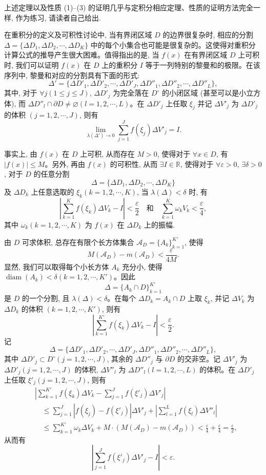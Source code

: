 上述定理以及性质 (1)--(3) 的证明几乎与定积分相应定理、性质的证明方法完全一样, 作为练习, 请读者自己给出.

在重积分的定义及可积性讨论中, 当有界闭区域 $D$ 的边界很复杂时, 相应的分割 $\Delta=\{\Delta D_1,\Delta D_2,\cdots,\Delta D_K\}$ 中的每个小集合也可能是很复杂的。这使得对重积分计算公式的推导产生很大困难。值得指出的是, 当 $f(x)$ 在有界闭区域 $D$ 上可积时, 我们可以证明 $f(x)$ 在 $D$ 上的重积分 $I$ 等于一列特别的黎曼和的极限。在该序列中, 黎曼和对应的分割具有下面的形式:
\[
  \Delta'=\{\Delta D'_1,\Delta D'_2,\cdots,\Delta D'_J,\Delta D''_1,\Delta D''_2,\cdots,\Delta D''_L\},
\]
其中, 对于 $\forall j(1\leqslant j\leqslant J)$, $\Delta D'_j$ 为完全落在 $D^\circ$ 的小闭区域 (甚至可以是小立方体), 而 $\Delta D''_l\cap\partial D\ne\varnothing(l=1,2,\cdots,L)$。在 $\Delta D'_j$ 上任取 $\xi_j$ 并记 $\Delta V'_j$ 为 $\Delta D'_j$ 的体积 $(j=1,2,\cdots,J)$, 则有
\[
  \lim_{\lambda(\Delta')\to0}\sum_{j=1}^J f(\xi_j)\Delta V'_j=I.
\]

事实上, 由 $f(x)$ 在 $D$ 上可积, 从而存在 $M>0$, 使得对于 $\forall x\in D$, 有 $|f(x)|\leqslant M$。另外, 再由 $f(x)$ 的可积性, 从而 $\exists I\in\mathbb R$, 使得对于 $\forall\varepsilon>0$, $\exists\delta>0$, 对于 $D$ 的任意分割
\[
  \Delta=\{\Delta D_1,\Delta D_2,\cdots,\Delta D_K\}
\]
及 $\Delta D_k$ 上任意选取的 $\xi_k(k=1,2,\cdots,K)$, 当 $\lambda(\Delta)<\delta$ 时, 有
\[
  \left|\sum_{k=1}^K f(\xi_k)\Delta V_k-I\right|<\frac{\varepsilon}{2}
  \quad\text{和}\quad
  \sum_{k=1}^K\omega_kV_k<\frac{\varepsilon}{4},
\]
其中 $\omega_k(k=1,2,\cdots,K)$ 为 $f(x)$ 在 $\Delta D_k$ 上的振幅.

由 $D$ 可求体积, 总存在有限个长方体集合 $\mathcal A_D=\{A_k\}_{k=1}^{K'}$, 使得
\[
  M(\mathcal A_D)-m(\mathcal A_D)<\frac{\varepsilon}{4M}.
\]
显然, 我们可以取得每个小长方体 $A_k$ 充分小, 使得 $\operatorname{diam}(A_k)<\delta(k=1,2,\cdots,K')$。因此
\[
  \Delta=\{A_k\cap D\}_{k=1}^{K'}
\]
是 $D$ 的一个分割, 且 $\lambda(\Delta)<\delta$。在每个 $\Delta D_k=A_k\cap D$ 上取 $\xi_k$, 并记 $\Delta V_k$ 为 $\Delta D_k$ 的体积 $(k=1,2,\cdots,K')$, 则有
\[
  \left|\sum_{k=1}^{K'} f(\xi_k)\Delta V_k-I\right|<\frac{\varepsilon}{2}.
\]
记
\[
  \Delta=\{\Delta D'_1,\Delta D'_2,\cdots,\Delta D'_J,\Delta D''_1,\Delta D''_2,\cdots,\Delta D''_L\},
\]
其中 $\Delta D'_j\subset D^\circ(j=1,2,\cdots,J)$, 其余的 $\Delta D''_j$ 与 $\partial D$ 的交非空。记 $\Delta V'_j$ 为 $\Delta D'_j(j=1,2,\cdots,J)$ 的体积, $\Delta V''_l$ 为 $\Delta D''_l(l=1,2,\cdots,L)$ 的体积。在 $\Delta D'_j$ 上任取 $\xi'_j(j=1,2,\cdots,J)$, 则有
\[
\begin{aligned}
  &\left|\sum_{k=1}^{K'}f(\xi_k)\Delta V_k-\sum_{j=1}^J f(\xi'_j)\Delta V'_j\right|\\
  &\quad\leqslant
  \sum_{j=1}^J|f(\xi_j)-f(\xi'_j)|\Delta V'_j+
  \left|\sum_{l=1}^L f(\xi_l)\Delta V''_l\right|\\
  &\quad\leqslant
  \sum_{k=1}^{K'}\omega_k\Delta V_k+M\cdot(M(\mathcal A_D)-m(\mathcal A_D))
  <\frac{\varepsilon}{4}+\frac{\varepsilon}{4}=\frac{\varepsilon}{2},
\end{aligned}
\]
从而有
\[
  \left|\sum_{j=1}^J f(\xi'_j)\Delta V'_j-I\right|<\varepsilon.
\]

